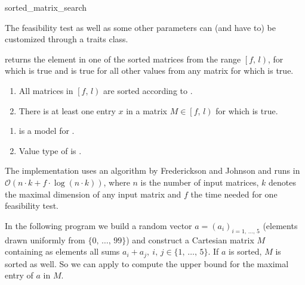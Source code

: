\begin{ccRefFunction}{sorted_matrix_search}
\begin{ccAdvanced}
    The feasibility test as well as some other parameters can (and
    have to) be customized through a traits class. 
    

    \def\ccLongParamLayout{\ccTrue} 
    

    returns the element  in one of the sorted matrices from the
    range $\left[ f,\, l \right)$, for which 
    is true and  is true for all other
     values from any matrix for which  is true.
    
    \ccPrecond
    \begin{enumerate}
    \item All matrices in $\left[f,\, l\right)$ are sorted according
      to .
    \item There is at least one entry $x$ in a matrix $M \in
      \left[f,\, l\right)$ for which  is
      true.
    \end{enumerate}
    
    \ccRequire
    \begin{enumerate}
    \item {} is a model for
      .
    \item Value type of  is .
    \end{enumerate}
    
    \ccSeeAlso
    
    \ccImplementation The implementation uses an algorithm by
    Frederickson and Johnson\cite{fj-fkppc-83,fj-gsrsm-84} and runs in
    $\mathcal{O}(n \cdot k + f \cdot \log (n \cdot k))$, where $n$ is
    the number of input matrices, $k$ denotes the maximal dimension of
    any input matrix and $f$ the time needed for one feasibility test.
    
    \ccExample In the following program we build a random vector $a =
    (a_i)_{i = 1,\,\ldots,\,5}$ (elements drawn uniformly from $\{
    0,\,\ldots,\,99 \}$) and construct a Cartesian matrix $M$
    containing as elements all sums $a_i + a_j,\: i,\,j \in
    \{1,\,\ldots,\,5\}$. If $a$ is sorted, $M$ is sorted as well. So
    we can apply  to compute the upper bound
    for the maximal entry of $a$ in $M$.
    

  \end{ccAdvanced}
\end{ccRefFunction}

